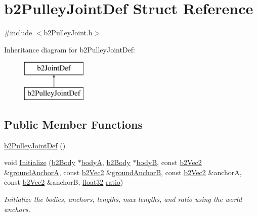 \hypertarget{structb2_pulley_joint_def}{}\section{b2\+Pulley\+Joint\+Def Struct Reference}
\label{structb2_pulley_joint_def}


{\ttfamily \#include $<$b2\+Pulley\+Joint.\+h$>$}

Inheritance diagram for b2\+Pulley\+Joint\+Def\+:\begin{figure}[H]
\begin{center}
\leavevmode
\includegraphics[height=2.000000cm]{structb2_pulley_joint_def}
\end{center}
\end{figure}
\subsection*{Public Member Functions}
\begin{DoxyCompactItemize}
\item 
\mbox{\hyperlink{structb2_pulley_joint_def_ab006bb8b7ea6bea6e0fd8cbaaacb33b0}{b2\+Pulley\+Joint\+Def}} ()
\item 
void \mbox{\hyperlink{structb2_pulley_joint_def_abef614a93562b82aa3b5f8cac17d1ce8}{Initialize}} (\mbox{\hyperlink{classb2_body}{b2\+Body}} $\ast$\mbox{\hyperlink{structb2_joint_def_a8cd54c93da396be75a9788f2c6897f05}{bodyA}}, \mbox{\hyperlink{classb2_body}{b2\+Body}} $\ast$\mbox{\hyperlink{structb2_joint_def_aa4f4dee2fbcd12187b19506b60e68e3d}{bodyB}}, const \mbox{\hyperlink{structb2_vec2}{b2\+Vec2}} \&\mbox{\hyperlink{structb2_pulley_joint_def_aae77c020ce4629ab9e03560e28aa853d}{ground\+AnchorA}}, const \mbox{\hyperlink{structb2_vec2}{b2\+Vec2}} \&\mbox{\hyperlink{structb2_pulley_joint_def_aa412b9f3bffd1fb69ace14f9b3e03b82}{ground\+AnchorB}}, const \mbox{\hyperlink{structb2_vec2}{b2\+Vec2}} \&anchorA, const \mbox{\hyperlink{structb2_vec2}{b2\+Vec2}} \&anchorB, \mbox{\hyperlink{b2_settings_8h_aacdc525d6f7bddb3ae95d5c311bd06a1}{float32}} \mbox{\hyperlink{structb2_pulley_joint_def_af35074246aeacbf239c11682642b31f5}{ratio}})
\begin{DoxyCompactList}\small\item\em Initialize the bodies, anchors, lengths, max lengths, and ratio using the world anchors. \end{DoxyCompactList}\end{DoxyCompactItemize}
